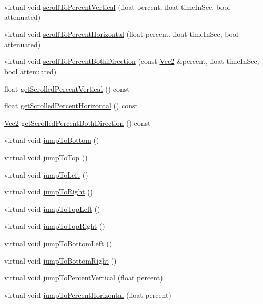 \begin{DoxyCompactItemize}
virtual void \hyperlink{classui_1_1ScrollView_a93b3273e329979ef06f957db24fc609f}{scroll\+To\+Percent\+Vertical} (float percent, float time\+In\+Sec, bool attenuated)
\item 
virtual void \hyperlink{classui_1_1ScrollView_ab1597dbcdad3a4a288330ea876807136}{scroll\+To\+Percent\+Horizontal} (float percent, float time\+In\+Sec, bool attenuated)
\item 
virtual void \hyperlink{classui_1_1ScrollView_a26a4859c788c789d060fbfb2c268eb7a}{scroll\+To\+Percent\+Both\+Direction} (const \hyperlink{classVec2}{Vec2} \&percent, float time\+In\+Sec, bool attenuated)
\item 
float \hyperlink{classui_1_1ScrollView_aedb8ee9f6bae83b039349608a14ccfb8}{get\+Scrolled\+Percent\+Vertical} () const
\item 
float \hyperlink{classui_1_1ScrollView_a409ca6d12895ea1567ef8c1f0992e80b}{get\+Scrolled\+Percent\+Horizontal} () const
\item 
\hyperlink{classVec2}{Vec2} \hyperlink{classui_1_1ScrollView_a2d412ef2a2f554df353d44ef00b685c8}{get\+Scrolled\+Percent\+Both\+Direction} () const
\item 
virtual void \hyperlink{classui_1_1ScrollView_aa395ac179eb47e58b4618829c4705892}{jump\+To\+Bottom} ()
\item 
virtual void \hyperlink{classui_1_1ScrollView_a39f933df289a40b00050405c0978c2e5}{jump\+To\+Top} ()
\item 
virtual void \hyperlink{classui_1_1ScrollView_a12212f997efa29c01841850ea790f60a}{jump\+To\+Left} ()
\item 
virtual void \hyperlink{classui_1_1ScrollView_a4d2fe47c1e20b30c08d624afe9d8cd2c}{jump\+To\+Right} ()
\item 
virtual void \hyperlink{classui_1_1ScrollView_ab69e73837690c7891ea0bfb88d28256e}{jump\+To\+Top\+Left} ()
\item 
virtual void \hyperlink{classui_1_1ScrollView_a38cb736ff123d1cda6f81d98b3ef3e97}{jump\+To\+Top\+Right} ()
\item 
virtual void \hyperlink{classui_1_1ScrollView_ac8e5642982c561796291b17dafc6dbb7}{jump\+To\+Bottom\+Left} ()
\item 
virtual void \hyperlink{classui_1_1ScrollView_a9fa6eb22d20be5d5e4230ff21570bffb}{jump\+To\+Bottom\+Right} ()
\item 
virtual void \hyperlink{classui_1_1ScrollView_ad294667d3dfde15406be78f2a20a9ab5}{jump\+To\+Percent\+Vertical} (float percent)
\item 
virtual void \hyperlink{classui_1_1ScrollView_a3cddd274e2fcbce1489608b7c581a14d}{jump\+To\+Percent\+Horizontal} (float percent)

\end{DoxyCompactItemize}
